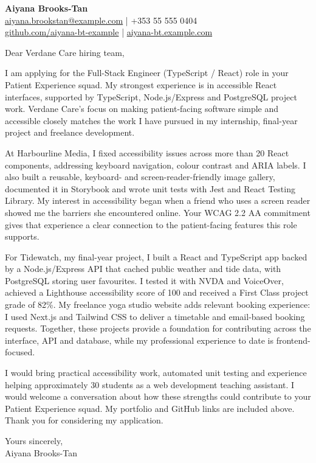 \documentclass[11pt,a4paper]{article}
\begin{document}
{\Large\bfseries\color{primarycolor} Aiyana Brooks-Tan}\\
\href{mailto:aiyana.brookstan@example.com}{aiyana.brookstan@example.com} | +353 55 555 0404\\
\href{https://github.com/aiyana-bt-example}{github.com/aiyana-bt-example} | \href{https://aiyana-bt.example.com}{aiyana-bt.example.com}

Dear Verdane Care hiring team,

I am applying for the Full-Stack Engineer (TypeScript / React) role in your Patient Experience squad. My strongest experience is in accessible React interfaces, supported by TypeScript, Node.js/Express and PostgreSQL project work. Verdane Care's focus on making patient-facing software simple and accessible closely matches the work I have pursued in my internship, final-year project and freelance development.

At Harbourline Media, I fixed accessibility issues across more than 20 React components, addressing keyboard navigation, colour contrast and ARIA labels. I also built a reusable, keyboard- and screen-reader-friendly image gallery, documented it in Storybook and wrote unit tests with Jest and React Testing Library. My interest in accessibility began when a friend who uses a screen reader showed me the barriers she encountered online. Your WCAG 2.2 AA commitment gives that experience a clear connection to the patient-facing features this role supports.

For Tidewatch, my final-year project, I built a React and TypeScript app backed by a Node.js/Express API that cached public weather and tide data, with PostgreSQL storing user favourites. I tested it with NVDA and VoiceOver, achieved a Lighthouse accessibility score of 100 and received a First Class project grade of 82\%. My freelance yoga studio website adds relevant booking experience: I used Next.js and Tailwind CSS to deliver a timetable and email-based booking requests. Together, these projects provide a foundation for contributing across the interface, API and database, while my professional experience to date is frontend-focused.

I would bring practical accessibility work, automated unit testing and experience helping approximately 30 students as a web development teaching assistant. I would welcome a conversation about how these strengths could contribute to your Patient Experience squad. My portfolio and GitHub links are included above. Thank you for considering my application.

Yours sincerely,\\
Aiyana Brooks-Tan
\end{document}
